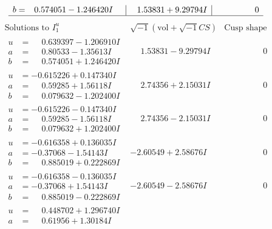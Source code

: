 \documentclass[1p]{elsarticle_modified}
\theoremstyle{definition}
\newcommand{\I}{\sqrt{-1}}
\begin{document}
$$\begin{array}{c|c|c}
\begin{aligned}
b &= \phantom{-}0.574051 - 1.246420 I\end{aligned}
 & \phantom{-}1.53831 + 9.29794 I & \phantom{-0.000000 } 0\\
 \hline 
 \end{array}$$\newpage$$\begin{array}{c|c|c}  
\text{Solutions to }I^u_{1}& \I (\text{vol} + \sqrt{-1}CS) & \text{Cusp shape}\\
 \hline 
\begin{aligned}
u &= \phantom{-}0.639397 - 1.206910 I \\
a &= \phantom{-}0.80533 - 1.35613 I \\
b &= \phantom{-}0.574051 + 1.246420 I\end{aligned}
 & \phantom{-}1.53831 - 9.29794 I & \phantom{-0.000000 } 0 \\ \hline\begin{aligned}
u &= -0.615226 + 0.147340 I \\
a &= \phantom{-}0.59285 + 1.56118 I \\
b &= \phantom{-}0.079632 - 1.202400 I\end{aligned}
 & \phantom{-}2.74356 + 2.15031 I & \phantom{-0.000000 } 0 \\ \hline\begin{aligned}
u &= -0.615226 - 0.147340 I \\
a &= \phantom{-}0.59285 - 1.56118 I \\
b &= \phantom{-}0.079632 + 1.202400 I\end{aligned}
 & \phantom{-}2.74356 - 2.15031 I & \phantom{-0.000000 } 0 \\ \hline\begin{aligned}
u &= -0.616358 + 0.136035 I \\
a &= -0.37068 - 1.54143 I \\
b &= \phantom{-}0.885019 + 0.222869 I\end{aligned}
 & -2.60549 + 2.58676 I & \phantom{-0.000000 } 0 \\ \hline\begin{aligned}
u &= -0.616358 - 0.136035 I \\
a &= -0.37068 + 1.54143 I \\
b &= \phantom{-}0.885019 - 0.222869 I\end{aligned}
 & -2.60549 - 2.58676 I & \phantom{-0.000000 } 0 \\ \hline\begin{aligned}
u &= \phantom{-}0.448702 + 1.296740 I \\
a &= \phantom{-}0.61956 + 1.30184 I \\

\end{aligned}
\end{array}$$
\end{document}
